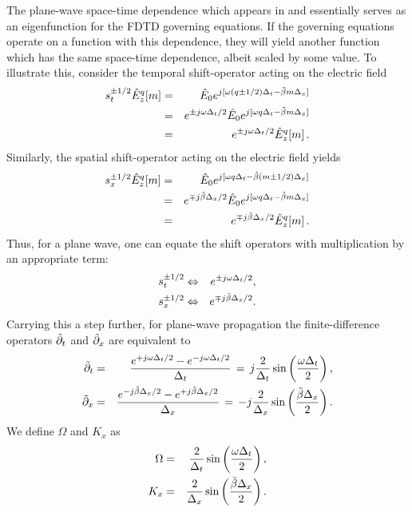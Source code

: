 The plane-wave space-time dependence which appears in
 and  essentially serves as an
eigenfunction for the FDTD governing equations.  If the governing
equations operate on a function with this dependence, they will yield
another function which has the same space-time dependence, albeit
scaled by some value.  To illustrate this, consider the temporal
shift-operator acting on the electric field
\begin{eqnarray}
  s_t^{\pm 1/2}\fdtd{\hat{E}_z}{m}{q} &=&
    \hat{E}_0 e^{j[\omega (q\pm 1/2) \Delt - \tbeta m \Delx]}
    \nonumber \\
   &=&
     e^{\pm j\omega\Delt/2}
     \hat{E}_0 e^{j[\omega q \Delt - \tbeta m \Delx]}
     \nonumber \\
   &=&
     e^{\pm j\omega\Delt/2}
    \fdtd{\hat{E}_z}{m}{q}.
\end{eqnarray}
Similarly, the spatial shift-operator acting on the electric field
yields
\begin{eqnarray}
  s_x^{\pm 1/2}\fdtd{\hat{E}_z}{m}{q} &=&
    \hat{E}_0 e^{j[\omega q \Delt - \tbeta (m \pm 1/2) \Delx]}
    \nonumber\\
   &=&
    e^{\mp j\tbeta\Delx/2}
    \hat{E}_0 e^{j[\omega q \Delt - \tbeta m \Delx]}
    \nonumber\\
   &=&
    e^{\mp j\tbeta\Delx/2}
    \fdtd{\hat{E}_z}{m}{q}.
\end{eqnarray}
Thus, for a plane wave, one can equate the shift operators with
multiplication by an appropriate term:
\begin{eqnarray}
  s_t^{\pm 1/2} &\Leftrightarrow& e^{\pm j\omega\Delt/2}, 
  \label{eq:temporalShiftEquiv}
  \\
  s_x^{\pm 1/2} &\Leftrightarrow& e^{\mp j\tbeta\Delx/2}.
\end{eqnarray}
Carrying this a step further, for plane-wave propagation the
finite-difference operators $\tpartial_t$ and $\tpartial_x$ are
equivalent to
\begin{eqnarray}
  \tpartial_t &=& \frac{e^{+j\omega\Delt/2}-e^{-j\omega\Delt/2}}{\Delt} 
         \,=\, j\frac{2}{\Delt}\sin\left(\frac{\omega\Delt}{2}\right), \\
  \tpartial_x &=& \frac{e^{-j\tbeta\Delx/2}-e^{+j\tbeta\Delx/2}}{\Delx} 
         \,=\, -j\frac{2}{\Delx}\sin\left(\frac{\tbeta\Delx}{2}\right).
\end{eqnarray}
We define $\Omega$ and $K_x$ as
\begin{eqnarray}
  \Omega &=& \frac{2}{\Delt}\sin\left(\frac{\omega\Delt}{2}\right), \\
  K_x &=& \frac{2}{\Delx}\sin\left(\frac{\tbeta\Delx}{2}\right).
  \label{eq:KxDefinition}
\end{eqnarray}
